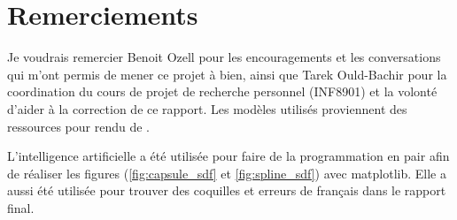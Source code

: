 \section{Remerciements}

Je voudrais remercier Benoit Ozell pour les encouragements et les conversations qui m'ont permis de mener ce projet à bien, ainsi que Tarek Ould-Bachir pour la coordination du cours de projet de recherche personnel (INF8901) et la volonté d'aider à la correction de ce rapport. Les modèles utilisés proviennent des ressources pour rendu de \textcite{resources16}.

L'intelligence artificielle a été utilisée pour faire de la programmation en pair afin de réaliser les figures (\ref{fig:capsule_sdf} et \ref{fig:spline_sdf}) avec matplotlib. Elle a aussi été utilisée pour trouver des coquilles et erreurs de français dans le rapport final.
